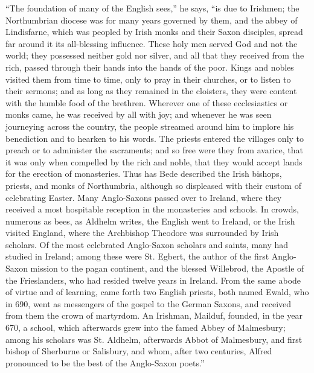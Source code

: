 ``The foundation of many of the English sees,'' he says,
``is due to Irishmen; the Northumbrian diocese was for many years
governed by them, and the abbey of Lindisfarne, which was peopled by
Irish monks and their Saxon disciples, spread far around it its
all-blessing influence. These holy men served God and not the world;
they possessed neither gold nor silver, and all that they
received from the rich, passed through their hands into the hands of
the poor. Kings and nobles visited them from time to time, only to
pray in their churches, or to listen to their sermons; and as long as
they remained in the cloisters, they were content with the humble food
of the brethren. Wherever one of these ecclesiastics or monks came, he
was received by all with joy; and whenever he was seen journeying
across the country, the people streamed around him to implore his
benediction and to hearken to his words. The priests entered the
villages only to preach or to administer the sacraments; and so free
were they from avarice, that it was only when compelled by the rich
and noble, that they would accept lands for the erection of
monasteries. Thus has Bede described the Irish bishops, priests, and
monks of Northumbria, although so displeased with their custom of
celebrating Easter. Many Anglo-Saxons passed over to Ireland, where
they received a most hospitable reception in the monasteries and
schools. In crowds, numerous as bees, as Aldhelm writes, the English
went to Ireland, or the Irish visited England, where the Archbishop
Theodore was surrounded by Irish scholars. Of the most celebrated
Anglo-Saxon scholars and saints, many had studied in Ireland; among
these were St. Egbert, the author of the first Anglo-Saxon mission to
the pagan continent, and the blessed Willebrod, the Apostle of the
Frieslanders, who had resided twelve years in Ireland. From the same
abode of virtue and of learning, came forth two English priests, both
named Ewald, who in 690, went as messengers of the gospel to the
German Saxons, and received from them the crown of martyrdom. An
Irishman, Mailduf, founded, in the year 670, a school, which
afterwards grew into the famed Abbey of Malmesbury; among his
scholars was St. Aldhelm, afterwards Abbot of Malmesbury, and first
bishop of Sherburne or Salisbury, and whom, after two centuries,
Alfred pronounced to be the best of the Anglo-Saxon poets.''


